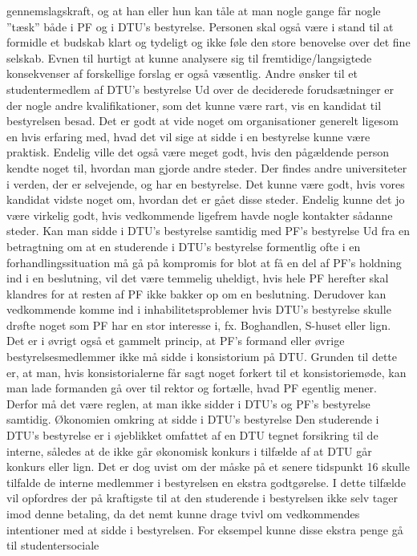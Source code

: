 gennemslagskraft, og at han eller hun kan tåle at man nogle gange får nogle ”tæsk” både i PF og i DTU’s bestyrelse.
Personen skal også være i stand til at formidle et budskab klart og tydeligt og ikke føle den store benovelse over det fine
selskab. Evnen til hurtigt at kunne analysere sig til fremtidige/langsigtede konsekvenser af forskellige forslag er også
væsentlig.
Andre ønsker til et studentermedlem af DTU’s bestyrelse
Ud over de deciderede forudsætninger er der nogle andre kvalifikationer, som det kunne være rart, vis en kandidat til
bestyrelsen besad. Det er godt at vide noget om organisationer generelt ligesom en hvis erfaring med, hvad det vil sige
at sidde i en bestyrelse kunne være praktisk.
Endelig ville det også være meget godt, hvis den pågældende person kendte noget til, hvordan man gjorde andre steder.
Der findes andre universiteter i verden, der er selvejende, og har en bestyrelse. Det kunne være godt, hvis vores
kandidat vidste noget om, hvordan det er gået disse steder. Endelig kunne det jo være virkelig godt, hvis vedkommende
ligefrem havde nogle kontakter sådanne steder.
Kan man sidde i DTU’s bestyrelse samtidig med PF’s bestyrelse
Ud fra en betragtning om at en studerende i DTU’s bestyrelse formentlig ofte i en forhandlingssituation må gå på
kompromis for blot at få en del af PF’s holdning ind i en beslutning, vil det være temmelig uheldigt, hvis hele PF
herefter skal klandres for at resten af PF ikke bakker op om en beslutning. Derudover kan vedkommende komme ind i
inhabilitetsproblemer hvis DTU’s bestyrelse skulle drøfte noget som PF har en stor interesse i, fx. Boghandlen, S-huset
eller lign.
Det er i øvrigt også et gammelt princip, at PF’s formand eller øvrige bestyrelsesmedlemmer ikke må sidde i
konsistorium på DTU. Grunden til dette er, at man, hvis konsistorialerne får sagt noget forkert til et konsistoriemøde,
kan man lade formanden gå over til rektor og fortælle, hvad PF egentlig mener.
Derfor må det være reglen, at man ikke sidder i DTU’s og PF’s bestyrelse samtidig.
Økonomien omkring at sidde i DTU’s bestyrelse
Den studerende i DTU’s bestyrelse er i øjeblikket omfattet af en DTU tegnet forsikring til de interne, således at de ikke
går økonomisk konkurs i tilfælde af at DTU går konkurs eller lign. Det er dog uvist om der måske på et senere tidspunkt
16
skulle tilfalde de interne medlemmer i bestyrelsen en ekstra godtgørelse. I dette tilfælde vil opfordres der på kraftigste
til at den studerende i bestyrelsen ikke selv tager imod denne betaling, da det nemt kunne drage tvivl om
vedkommendes intentioner med at sidde i bestyrelsen. For eksempel kunne disse ekstra penge gå til studentersociale
